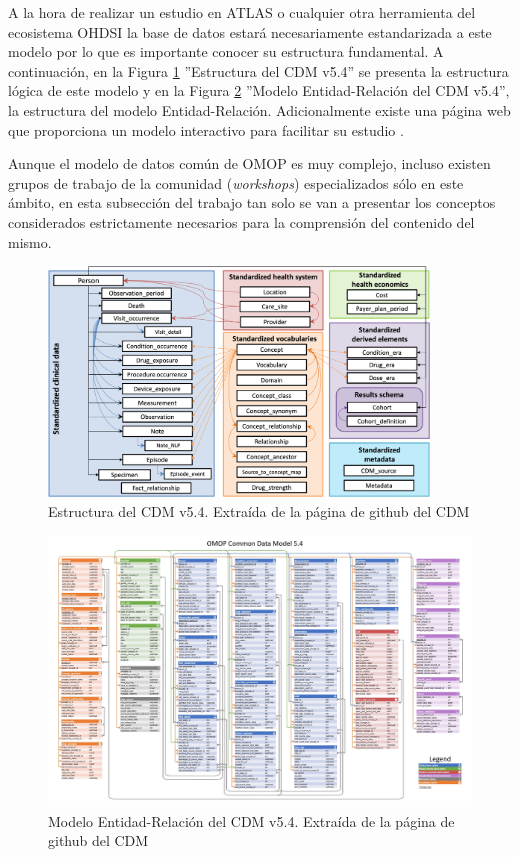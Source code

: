 A la hora de realizar un estudio en ATLAS o cualquier otra herramienta del ecosistema OHDSI la base de datos estará necesariamente estandarizada a este modelo por lo que es importante conocer su estructura fundamental. A continuación, en la Figura \ref{fig:cdm54} ''Estructura del CDM v5.4'' se presenta la estructura lógica de este modelo y en la Figura \ref{fig:cdm_ER} ''Modelo Entidad-Relación del CDM v5.4'', la estructura del modelo Entidad-Relación. Adicionalmente existe una página web que proporciona un modelo interactivo para facilitar su estudio \cite{CDMinteractive}.

Aunque el modelo de datos común de OMOP es muy complejo, incluso existen grupos de trabajo de la comunidad (\textit{workshops}) especializados sólo en este ámbito, en esta subsección del trabajo tan solo se van a presentar los conceptos considerados estrictamente necesarios para la comprensión del contenido del mismo.

\begin{figure}[H]
    \centering
    \includegraphics[width=0.90\textwidth]{figures/cdm54.png}
     \caption{Estructura del CDM v5.4. Extraída de la página de github del CDM \cite{gitPagesCMD}}
    \label{fig:cdm54}
\end{figure}

\begin{figure}[H]
    \centering
    \includegraphics[width=1\textwidth]{figures/cdm_ER.jpg}
     \caption{Modelo Entidad-Relación del CDM v5.4. Extraída de la página de github del CDM \cite{gitPagesCMD}}
    \label{fig:cdm_ER}
\end{figure}

